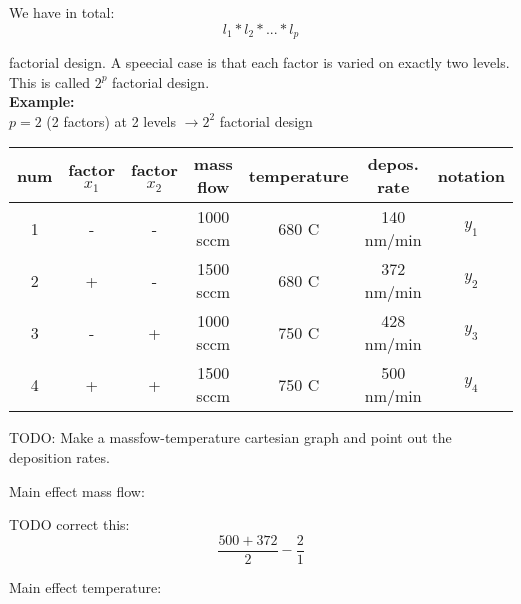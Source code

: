 We have in total:
	$$l_1*l_2*...*l_p$$

factorial design. A speecial case is that each factor is varied on exactly two levels. This is called $2^p$ factorial design. \\

\textbf{Example:}\\

$p=2$ (2 factors) at 2 levels $\rightarrow 2^2$ factorial design\\

\begin{center}
	\begin{tabular}{|c|c|c|c|c|c|c|}
		\hline
		\rule[-1ex]{0pt}{2.5ex} num & factor $x_1$ & factor $x_2$ & mass flow  & temperature & depos. rate & notation \\
		\hline
		\rule[-1ex]{0pt}{2.5ex} 1 & - & - & 1000 sccm & 680 \degree C & 140 nm/min & $y_1$ \\
		\hline
		\rule[-1ex]{0pt}{2.5ex} 2 & + & - & 1500 sccm & 680 \degree C & 372 nm/min & $y_2$ \\
		\hline
		\rule[-1ex]{0pt}{2.5ex} 3 & - & + & 1000 sccm & 750 \degree C & 428 nm/min & $y_3$ \\
		\hline
		\rule[-1ex]{0pt}{2.5ex} 4 & + & + & 1500 sccm & 750 \degree C & 500 nm/min & $y_4$ \\
		\hline
	\end{tabular}
\end{center}

TODO: Make a massfow-temperature cartesian graph and point out the deposition rates.


Main effect mass flow:

TODO correct this: $$\frac{500+372}{2} - \frac{2}{1}$$

Main effect temperature:

